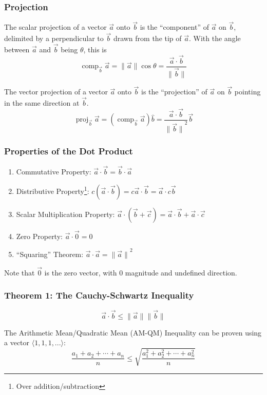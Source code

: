 \documentclass{article}
\DeclareMathOperator{\comp}{comp}
\DeclareMathOperator{\proj}{proj}
\newcommand{\vect}[1]{\ensuremath{\overrightarrow{#1}}}
\newcommand{\magnitude}[1]{\ensuremath{\lVert #1 \rVert}}
\newcommand{\magvect}[1]{\magnitude{\vect{#1}}}
\begin{document}
\subsubsection{Projection}
The scalar projection of a vector \vect{a} onto \vect{b} is the ``component'' of \vect{a} on \vect{b}, delimited by a perpendicular to \vect{b} drawn from the tip of \vect{a}. With the angle between \vect{a} and \vect{b} being $\theta$, this is
$$\comp_{\vect{b}} \vect{a} = \magvect{a}\cos{\theta} = \frac{\vect{a} \cdot \vect{b}}{\magvect{b}}$$

The vector projection of a vector \vect{a} onto \vect{b} is the ``projection'' of \vect{a} on \vect{b} pointing in the same direction at \vect{b}.
$$\proj_{\vect{b}}\vect{a} = \left(\comp_{\vect{b}}\vect{a}\right)\hat{b} = \frac{\vect{a} \cdot \vect{b}}{\magvect{b}^2} \vect{b}$$

\subsubsection{Properties of the Dot Product}
\begin{enumerate}
    \item Commutative Property: $\vect{a} \cdot \vect{b} = \vect{b} \cdot \vect{a}$
    \item Distributive Property\footnote{Over addition/subtraction}: $c\left(\vect{a} \cdot \vect{b}\right) = c\vect{a} \cdot \vect{b} = \vect{a} \cdot c\vect{b}$
    \item Scalar Multiplication Property: $\vect{a} \cdot \left(\vect{b} + \vect{c}\right) = \vect{a} \cdot \vect{b} + \vect{a} \cdot \vect{c}$
    \item Zero Property: $\vect{a} \cdot \vect{0} = 0$
    \item ``Squaring'' Theorem: $\vect{a} \cdot \vect{a} = \magvect{a}^2$
\end{enumerate}
Note that $\vect{0}$ is the zero vector, with $0$ magnitude and undefined direction.

\subsubsection{Theorem 1: The Cauchy-Schwartz Inequality}
$$\vect{a} \cdot \vect{b} \le \magvect{a}\magvect{b}$$

The Arithmetic Mean/Quadratic Mean (AM-QM) Inequality can be proven using a vector $\langle1, 1, 1, ...\rangle$:
$$\frac{a_1 + a_2 + \cdots + a_n}{n} \le \sqrt{\frac{a_1^2 + a_2^2 + \cdots + a_n^2}{n}}$$
\end{document}
